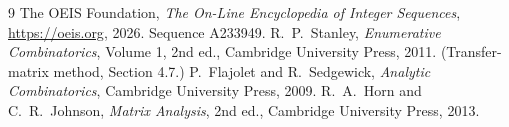 \documentclass[11pt,a4paper]{article}
\theoremstyle{plain}
\theoremstyle{definition}
\begin{document}
\begin{thebibliography}{9}
 The OEIS Foundation, \emph{The On-Line Encyclopedia of Integer
Sequences}, \url{https://oeis.org}, 2026. Sequence A233949.
 R.~P.~Stanley, \emph{Enumerative Combinatorics}, Volume 1, 2nd ed.,
Cambridge University Press, 2011. (Transfer-matrix method, Section 4.7.)
 P.~Flajolet and R.~Sedgewick, \emph{Analytic Combinatorics}, Cambridge
University Press, 2009.
 R.~A.~Horn and C.~R.~Johnson, \emph{Matrix Analysis}, 2nd ed., Cambridge
University Press, 2013.
\end{thebibliography}
\end{document}
